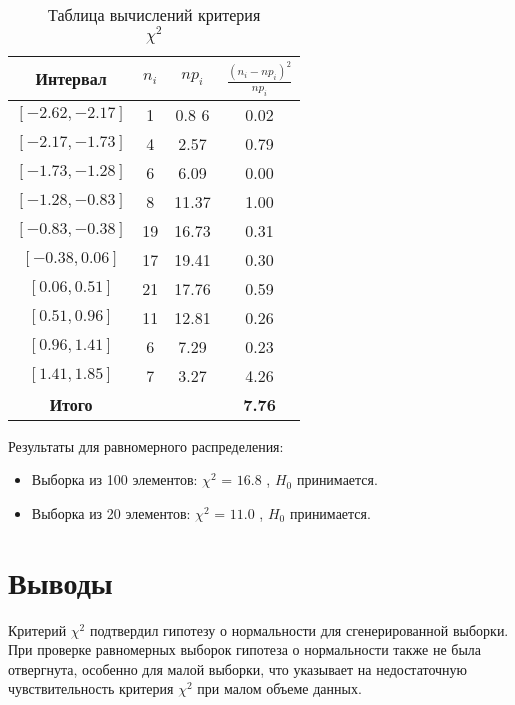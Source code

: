 \documentclass[a4paper]{article}
\begin{document}
    \begin{table}[H]
        \centering
        \caption{Таблица вычислений критерия $$\chi^2$$}
        \begin{tabular}{|c|c|c|c|}
            \hline
            Интервал         & $n_i$ & $np_i$ & $\frac{(n_i - np_i)^2}{np_i}$ \\
            \hline
            $[-2.62, -2.17]$ & 1     & 0.8 6  & 0.02                          \\
            $[-2.17, -1.73]$ & 4     & 2.57   & 0.79                          \\
            $[-1.73, -1.28]$ & 6     & 6.09   & 0.00                          \\
            $[-1.28, -0.83]$ & 8     & 11.37  & 1.00                          \\
            $[-0.83, -0.38]$ & 19    & 16.73  & 0.31                          \\
            $[-0.38, 0.06]$  & 17    & 19.41  & 0.30                          \\
            $[0.06, 0.51]$   & 21    & 17.76  & 0.59                          \\
            $[0.51, 0.96]$   & 11    & 12.81  & 0.26                          \\
            $[0.96, 1.41]$   & 6     & 7.29   & 0.23                          \\
            $[1.41, 1.85]$   & 7     & 3.27   & 4.26                          \\
            \hline
            \textbf{Итого}   &       &        & \textbf{7.76}                 \\
            \hline
        \end{tabular}\label{tab:table}
    \end{table}

    Результаты для равномерного распределения:
    \begin{itemize}
        \item Выборка из 100 элементов: $\chi^2$ = $16.8$ , $H_0$ принимается.
        \item Выборка из 20 элементов: $\chi^2$ = $11.0$ , $H_0$ принимается.
    \end{itemize}


    \section{Выводы}
    Критерий $\chi^2$  подтвердил гипотезу о нормальности для сгенерированной выборки.
    При проверке равномерных выборок гипотеза о нормальности также не была отвергнута, особенно для малой выборки,
    что указывает на недостаточную чувствительность критерия $\chi^2$ при малом объеме данных.
\end{document}
